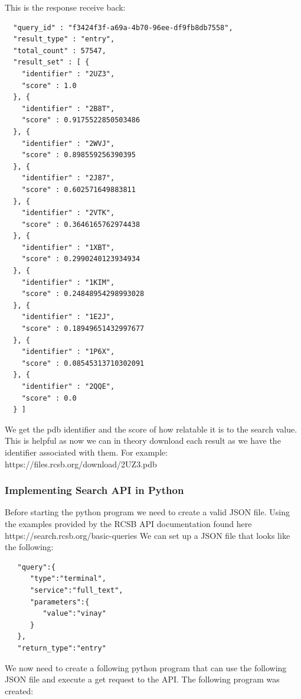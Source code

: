 \documentclass[]{final_report}
\begin{document}
This is the response receive back:

\begin{lstlisting}
  "query_id" : "f3424f3f-a69a-4b70-96ee-df9fb8db7558",
  "result_type" : "entry",
  "total_count" : 57547,
  "result_set" : [ {
    "identifier" : "2UZ3",
    "score" : 1.0
  }, {
    "identifier" : "2B8T",
    "score" : 0.9175522850503486
  }, {
    "identifier" : "2WVJ",
    "score" : 0.898559256390395
  }, {
    "identifier" : "2J87",
    "score" : 0.602571649883811
  }, {
    "identifier" : "2VTK",
    "score" : 0.3646165762974438
  }, {
    "identifier" : "1XBT",
    "score" : 0.2990240123934934
  }, {
    "identifier" : "1KIM",
    "score" : 0.24848954298993028
  }, {
    "identifier" : "1E2J",
    "score" : 0.18949651432997677
  }, {
    "identifier" : "1P6X",
    "score" : 0.08545313710302091
  }, {
    "identifier" : "2QQE",
    "score" : 0.0
  } ]
\end{lstlisting}

We get the pdb identifier and the score of how relatable it is to the search value. This is helpful as now we can in theory download each result as we have the identifier associated with them. For example: https://files.rcsb.org/download/2UZ3.pdb

\subsubsection{Implementing Search API in Python}

Before starting the python program we need to create a valid JSON file. Using the examples provided by the RCSB API documentation found here https://search.rcsb.org/basic-queries We can set up a JSON file that looks like the following:

\begin{lstlisting}
   "query":{
      "type":"terminal",
      "service":"full_text",
      "parameters":{
         "value":"vinay"
      }
   },
   "return_type":"entry"
\end{lstlisting}

We now need to create a following python program that can use the following JSON file and execute a get request to the API. The following program was created: 
\end{document}
